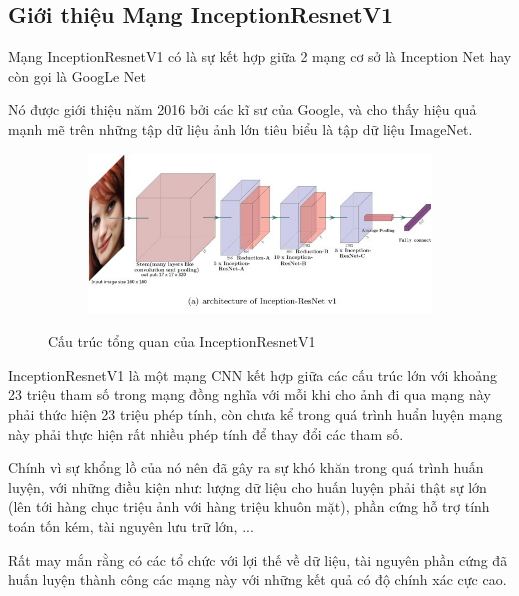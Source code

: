 \newpage
\subsection{Giới thiệu Mạng InceptionResnetV1}

Mạng InceptionResnetV1\cite{resnet} có là sự kết hợp giữa 2 mạng cơ sở là Inception Net hay còn gọi là GoogLe Net

Nó được giới thiệu năm 2016 bởi các kĩ sư của Google, và cho thấy hiệu quả mạnh mẽ trên những tập dữ liệu ảnh lớn
tiêu biểu là tập dữ liệu ImageNet.

\begin{figure}
    \begin{subfigure}{1.\textwidth}
        \begin{center}
            \includegraphics[width=1.\linewidth]{Chapters/items/chap2_19.jpg}
        \end{center}
        \label{fig: chap2_19}
    \end{subfigure}
    \caption{Cấu trúc tổng quan của InceptionResnetV1}
\end{figure}

InceptionResnetV1 là một mạng CNN kết hợp giữa các cấu trúc lớn với khoảng 23 triệu tham số trong mạng đồng nghĩa với
mỗi khi cho ảnh đi qua mạng này phải thức hiện 23 triệu phép tính, còn chưa kể trong quá trình huẩn luyện
mạng này phải thực hiện rất nhiều phép tính để thay đổi các tham số.

Chính vì sự khổng lồ của nó nên đã gây ra sự khó khăn trong quá trình huấn luyện, với những điều kiện như: 
lượng dữ liệu cho huấn luyện phải thật sự lớn (lên tới hàng chục triệu ảnh với hàng triệu khuôn mặt),
phần cứng hỗ trợ tính toán tốn kém, tài nguyên lưu trữ lớn, ...

Rất may mắn rằng có các tổ chức với lợi thế về dữ liệu, tài nguyên phần cứng đã huấn luyện thành công
các mạng này với những kết quả có độ chính xác cực cao.

